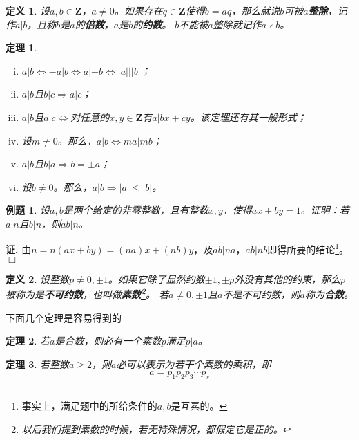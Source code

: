 \documentclass{ctexrep}
\newcommand{\bbold}[1]{\textbf{#1}}
\newcommand{\aabs}[1]{{ \left| #1 \right| }}
\newcommand{\Z}{\boldsymbol{Z}}
\newtheorem{thrm}{定理}[section]
\newtheorem{exmp}{例题}[section]
\newtheorem{defn}{定义}[section]
\renewenvironment{proof}[1][证]{\noindent \textbf{#1.} }{\hfill$\Box$}
\begin{document}
\begin{defn}
设$a,b \in \Z$，$a \neq 0$。如果存在$q \in \Z$使得$b=aq$，那么就说$b$可被$a$\bbold{整除}，记作$a|b$，且称$b$是$a$的\bbold{倍数}，$a$是$b$的\bbold{约数}。
$b$不能被$a$整除就记作$a \nmid b$。
\end{defn}

\begin{thrm}
\begin{enumerate}[(i)]
\item $a|b \iff -a|b \iff a|-b \iff \aabs{a}|\aabs{b}$；
\item $a|b$且$b|c \Rightarrow a|c$；
\item $a|b$且$a|c \iff $对任意的$x,y \in \Z$有$a|bx+cy$。该定理还有其一般形式；
\item 设$m \neq 0$。那么，$a|b \iff ma|mb$；
\item $a|b$且$b|a \Rightarrow b = \pm a$；
\item 设$b \neq 0$。那么，$a|b \Rightarrow \aabs{a}\leq\aabs{b}$。
\end{enumerate}
\end{thrm}

\begin{exmp}
设$a,b$是两个给定的非零整数，且有整数$x,y$，使得$ax+by=1$。证明：若$a|n$且$b|n$，则$ab|n$。
\end{exmp}
\begin{proof}
由$n=n(ax+by)=(na)x+(nb)y$，及$ab|na$，$ab|nb$即得所要的结论\footnote{事实上，满足题中的所给条件的$a,b$是互素的。}。
\end{proof}

\begin{defn}
设整数$p \neq 0, \pm 1$。如果它除了显然约数$\pm 1, \pm p$外没有其他的约束，那么$p$被称为是\bbold{不可约数}，也叫做\bbold{素数\footnote{以后我们提到素数的时候，若无特殊情况，都假定它是正的。}}。
若$a \neq 0,\pm 1$且$a$不是不可约数，则$a$称为\bbold{合数}。
\end{defn}

下面几个定理是容易得到的
\begin{thrm}
若$a$是合数，则必有一个素数$p$满足$p|a$。
\end{thrm}

\begin{thrm}\label{THRM:prime}
若整数$a \geq 2$，则$a$必可以表示为若干个素数的乘积，即
\begin{displaymath}
a=p_1 p_2 p_3 \dotsm p_s
\end{displaymath}
\end{thrm}
\end{document}
